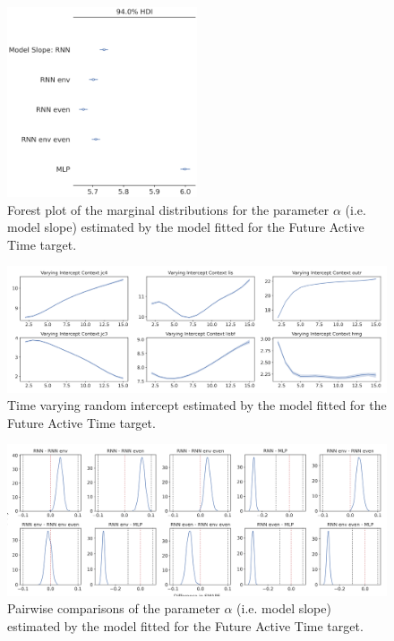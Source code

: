 \begin{figure}[ht]
\centering
\includegraphics[width=0.5\textwidth]{images/appendix_C/Future Active Time_models_3.png}
\caption[\textbf{Future active time model fixed effect}]{Forest plot of the marginal distributions for the parameter $\alpha$ (i.e. model slope) estimated by the model fitted for the Future Active Time target.}
\label{model_act_3}
\end{figure} \FloatBarrier

\begin{figure}[ht]
\centering
\includegraphics[width=\textwidth]{images/appendix_C/Future Active Time_interc_3.png}
\caption[\textbf{Future active time time-varying random intercept}]{Time varying random intercept estimated by the model fitted for the Future Active Time target.}
\label{interc_act_3}
\end{figure} \FloatBarrier

\begin{figure}[ht]
\centering
\includegraphics[width=\textwidth]{images/appendix_C/Future_Active_Time_comp_3.png}
\caption[\textbf{Future active time pairwise comparisons of model fixed effect}]{Pairwise comparisons of the parameter $\alpha$ (i.e. model slope) estimated by the model fitted for the Future Active Time target.}
\label{comp_act_3}
\end{figure} \FloatBarrier

